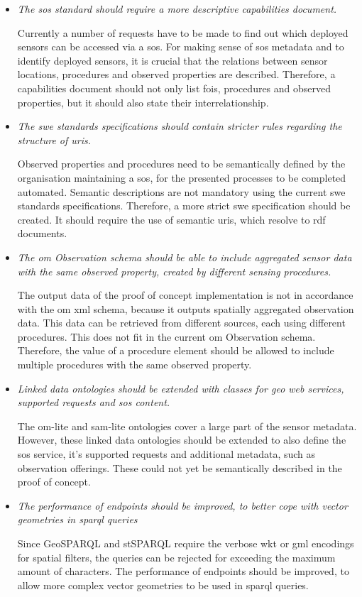 \begin{itemize}
	\item \textit{The \ac{sos} standard should require a more descriptive capabilities document.}
	
	Currently a number of requests have to be made to find out which deployed sensors can be accessed via a \ac{sos}. For making sense of \ac{sos} metadata and to identify deployed sensors, it is crucial that the relations between sensor locations, procedures and observed properties are described. Therefore, a capabilities document should not only list \acp{foi}, procedures and observed properties, but it should also state their interrelationship.    
	
	
	\item \textit{The \ac{swe} standards specifications should contain stricter rules regarding the structure of \acp{uri}.}
	
	Observed properties and procedures need to be semantically defined by the organisation maintaining a \ac{sos}, for the presented processes to be completed automated. Semantic descriptions are not mandatory using the current \ac{swe} standards specifications. Therefore, a more strict \ac{swe} specification should be created. It should require the use of semantic \acp{uri}, which resolve to \ac{rdf} documents. 
	
	
	\item \textit{The \ac{om} Observation schema should be able to include aggregated sensor data with the same observed property, created by different sensing procedures.}
	
	The output data of the proof of concept implementation is not in accordance with the \ac{om} \ac{xml} schema, because it outputs spatially aggregated observation data. This data can be retrieved from different sources, each using different procedures. This does not fit in the current \ac{om} Observation schema. Therefore, the value of a procedure element should be allowed to include multiple procedures with the same observed property.   
	
	
	\item \textit{Linked data ontologies should be extended with classes for geo web services, supported requests and \ac{sos} content.}
	
	The om-lite and sam-lite ontologies cover a large part of the sensor metadata. However, these linked data ontologies should be extended to also define the \ac{sos} service, it's supported requests and additional metadata, such as observation offerings. These could not yet be semantically described in the proof of concept.
	
	
	\item \textit{The performance of endpoints should be improved, to better cope with vector geometries in \ac{sparql} queries}
	
	Since GeoSPARQL and stSPARQL require the verbose \ac{wkt} or \acs{gml} encodings for spatial filters, the queries can be rejected for exceeding the maximum amount of characters. The performance of endpoints should be improved, to allow more complex vector geometries to be used in \ac{sparql} queries. 
	
\end{itemize} 

